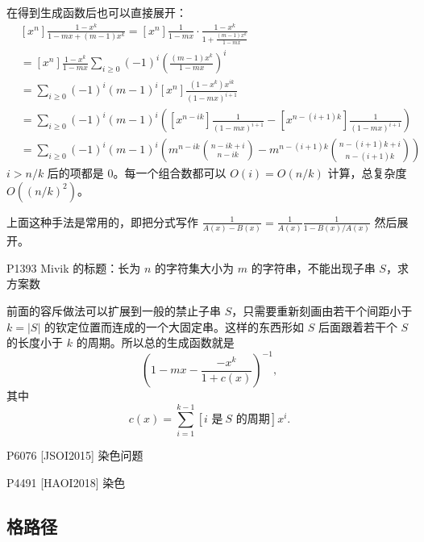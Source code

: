     \begin{solution}[做法五]
        在得到生成函数后也可以直接展开：
        $$
        \begin{aligned}
        &[x^n]\frac{1-x^k}{1-mx+(m-1)x^k}=[x^n]\frac{1}{1-mx}\cdot \frac{1-x^k}{1+\frac{(m-1)x^k}{1-mx}}\\
        &=[x^n]\frac{1-x^k}{1-mx}\sum_{i\ge 0}(-1)^i\left(\frac{(m-1)x^k}{1-mx}\right)^i\\
        &=\sum_{i\ge 0}(-1)^i(m-1)^i[x^n]\frac{(1-x^k)x^{ik}}{(1-mx)^{i+1}}\\
        &=\sum_{i\ge 0}(-1)^i(m-1)^i\left([x^{n-ik}]\frac{1}{(1-mx)^{i+1}}-[x^{n-(i+1)k}]\frac{1}{(1-mx)^{i+1}}\right)\\
        &=\sum_{i\ge 0}(-1)^i(m-1)^i\left(m^{n-ik}\binom{n-ik+i}{n-ik}-m^{n-(i+1)k}\binom{n-(i+1)k+i}{n-(i+1)k}\right)
        \end{aligned}
        $$
        $i>n/k$ 后的项都是 $0$。每一个组合数都可以 $O(i)=O(n/k)$ 计算，总复杂度 $O((n/k)^2)$。

        上面这种手法是常用的，即把分式写作 $\frac{1}{A(x)-B(x)}=\frac{1}{A(x)}\frac{1}{1-B(x)/A(x)}$ 然后展开。
    \end{solution}

    \begin{example}[（困难）禁止子串]
        P1393 Mivik 的标题：长为 $n$ 的字符集大小为 $m$ 的字符串，不能出现子串 $S$，求方案数
    \end{example}
    \begin{solution}
        前面的容斥做法可以扩展到一般的禁止子串 $S$，只需要重新刻画由若干个间距小于 $k=|S|$ 的钦定位置而连成的一个大固定串。这样的东西形如 $S$ 后面跟着若干个 $S$ 的长度小于 $k$ 的周期。所以总的生成函数就是
        $$
        \left(1-mx-\frac{-x^k}{1+c(x)}\right)^{-1},
        $$
        其中
        $$
        c(x)=\sum_{i=1}^{k-1}[i\text{ 是}\ S\text{ 的周期}]x^i.
        $$
    \end{solution}

    \begin{example}
         P6076 [JSOI2015] 染色问题
    \end{example}
   
    \begin{example}
        P4491 [HAOI2018] 染色
    \end{example}

\subsection{格路径}

